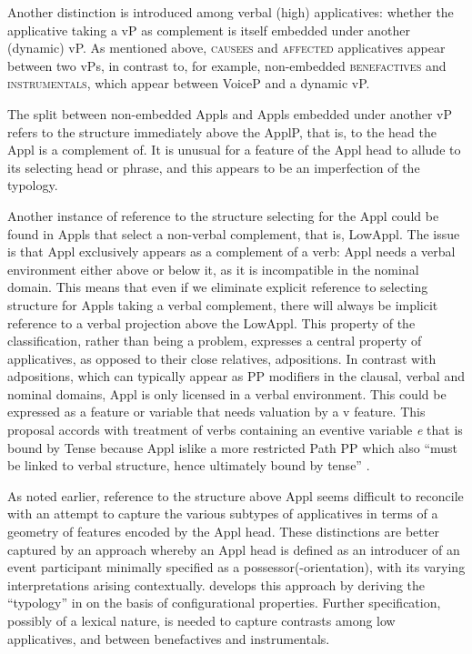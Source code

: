 \documentclass[output=paper,colorlinks,citecolor=brown,nonflat]{./langscibook}
\begin{document}
Another distinction is introduced among verbal (high) applicatives: whether the applicative taking a vP as complement is itself embedded under another (dynamic) vP. As mentioned above, \textsc{causees} and \textsc{affected} applicatives appear between two vPs, in contrast to, for example, non-embedded \textsc{benefactives} and \textsc{instrumentals}, which appear between VoiceP and a dynamic vP. 

The split between non-embedded Appls and Appls embedded under another vP refers to the structure immediately above the ApplP, that is, to the head the Appl is a complement of. It is unusual for a feature of the Appl head to allude to its selecting head or phrase, and this appears to be an imperfection of the typology.  

Another instance of reference to the structure selecting for the Appl could be found in Appls that select a non-verbal complement, that is, LowAppl. The issue is that Appl exclusively appears as a complement of a verb: Appl needs a verbal environment either above or below it, as it is incompatible in the nominal domain.  This means that even if we eliminate explicit reference to selecting structure for Appls taking a verbal complement, there will always be implicit reference to a verbal projection above the LowAppl. This property of the classification, rather than being a problem, expresses a central property of applicatives, as opposed to their close relatives, adpositions. In contrast with adpositions, which can typically appear as PP modifiers in the clausal, verbal and nominal domains, Appl is only licensed in a verbal environment. This could be expressed as a feature or variable that needs valuation by a v feature. This proposal accords with  treatment of verbs containing an eventive variable \textit{e} that is bound by Tense because Appl islike a more restricted Path PP which also “must be linked to verbal structure, hence ultimately bound by tense” \citep[35]{Svenonius2007}. 

As noted earlier, reference to the structure above Appl seems difficult to reconcile with an attempt to capture the various subtypes of applicatives in terms of a geometry of features encoded by the Appl head. These distinctions are better captured by an approach whereby an Appl head is defined as an introducer of an event participant minimally specified as a possessor(-orientation), with its varying interpretations arising contextually.  develops this approach by deriving the “typology” in  on the basis of configurational properties. Further specification, possibly of a lexical nature, is needed to capture contrasts among low applicatives, and between benefactives and instrumentals.  
\end{document}

